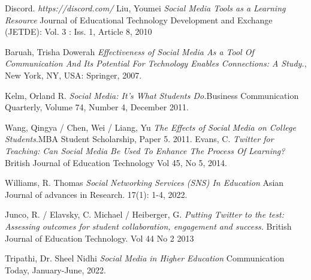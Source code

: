 \documentclass[lettersize,journal]{IEEEtran}
\begin{document}
\begin{thebibliography}{}

	Discord. {\it{https://discord.com/}}
        Liu, Youmei {\it{Social Media Tools as a Learning Resource}} Journal of Educational Technology Development and Exchange (JETDE): Vol. 3 : Iss. 1, Article 8, 2010

    Baruah, Trisha Dowerah {\it{Effectiveness of Social Media As a Tool Of Communication And Its Potential For Technology Enables Connections: A Study.}}, New York, NY, USA: Springer, 2007.

    Kelm, Orland R. {\it{Social Media: It's What Students Do.}}Business Communication Quarterly, Volume 74, Number 4, December 2011.

        Wang, Qingya / Chen, Wei / Liang, Yu {\it{The Effects of Social Media on College Students}}.MBA Student Scholarship, Paper 5. 2011.
        Evans, C. {\it{Twitter for Teaching: Can Social Media Be Used To Enhance The Process Of Learning?}} British Journal of Education Technology
Vol 45, No 5, 2014.

        Williams, R. Thomas {\it{Social Networking Services (SNS) In Education}}
        Asian Journal of advances in Research. 17(1): 1-4, 2022.

        Junco, R. / Elavsky, C. Michael / Heiberger, G. {\it{Putting Twitter to
        the test: Assessing outcomes for student collaboration, engagement and
        success.}} British Journal of Education Technology. Vol 44 No 2 2013

        Tripathi, Dr. Sheel Nidhi {\it{Social Media in Higher Education}}
        Communication Today, January-June, 2022.


\end{thebibliography}
\end{document}
